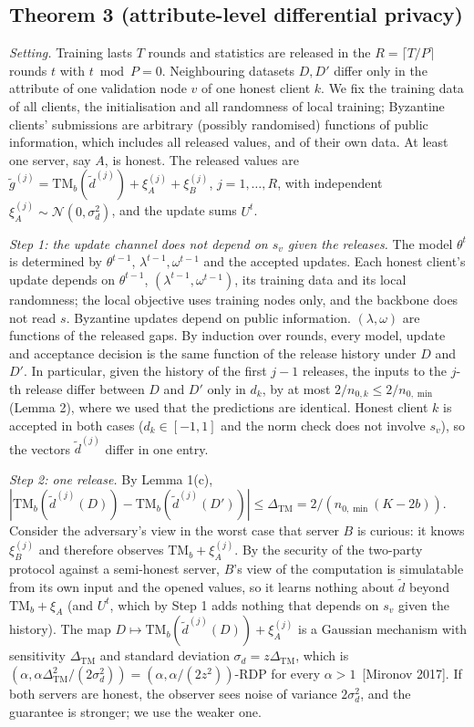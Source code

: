 \documentclass[11pt]{article}
\theoremstyle{plain}
\theoremstyle{definition}
\newcommand{\TM}{\mathrm{TM}_b}
\newcommand{\DTM}{\Delta_{\mathrm{TM}}}
\newcommand{\gt}{\tilde g}
\begin{document}
\subsection*{Theorem 3 (attribute-level differential privacy)}
\emph{Setting.} Training lasts $T$ rounds and statistics are released in the $R=\lceil T/P\rceil$ rounds $t$ with $t\bmod P=0$. Neighbouring datasets $D,D'$ differ only in the attribute of one validation node $v$ of one honest client $k$. We fix the training data of all clients, the initialisation and all randomness of local training; Byzantine clients' submissions are arbitrary (possibly randomised) functions of public information, which includes all released values, and of their own data. At least one server, say $A$, is honest. The released values are $\gt^{(j)}=\TM(\tilde d^{(j)})+\xi_A^{(j)}+\xi_B^{(j)}$, $j=1,\dots,R$, with independent $\xi_A^{(j)}\sim\mathcal{N}(0,\sigma_d^2)$, and the update sums $U^t$.

\emph{Step 1: the update channel does not depend on $s_v$ given the releases.} The model $\theta^{t}$ is determined by $\theta^{t-1}$, $\lambda^{t-1},\omega^{t-1}$ and the accepted updates. Each honest client's update depends on $\theta^{t-1}$, $(\lambda^{t-1},\omega^{t-1})$, its training data and its local randomness; the local objective uses training nodes only, and the backbone does not read $s$. Byzantine updates depend on public information. $(\lambda,\omega)$ are functions of the released gaps. By induction over rounds, every model, update and acceptance decision is the same function of the release history under $D$ and $D'$. In particular, given the history of the first $j-1$ releases, the inputs to the $j$-th release differ between $D$ and $D'$ only in $d_k$, by at most $2/n_{0,k}\le2/n_{0,\min}$ (Lemma 2), where we used that the predictions are identical. Honest client $k$ is accepted in both cases ($d_k\in[-1,1]$ and the norm check does not involve $s_v$), so the vectors $\tilde d^{(j)}$ differ in one entry.

\emph{Step 2: one release.} By Lemma 1(c), $|\TM(\tilde d^{(j)}(D))-\TM(\tilde d^{(j)}(D'))|\le\DTM=2/(n_{0,\min}(K-2b))$. Consider the adversary's view in the worst case that server $B$ is curious: it knows $\xi_B^{(j)}$ and therefore observes $\TM+\xi_A^{(j)}$. By the security of the two-party protocol against a semi-honest server, $B$'s view of the computation is simulatable from its own input and the opened values, so it learns nothing about $\tilde d$ beyond $\TM+\xi_A$ (and $U^t$, which by Step 1 adds nothing that depends on $s_v$ given the history). The map $D\mapsto\TM(\tilde d^{(j)}(D))+\xi_A^{(j)}$ is a Gaussian mechanism with sensitivity $\DTM$ and standard deviation $\sigma_d=z\DTM$, which is $(\alpha,\alpha\DTM^2/(2\sigma_d^2))=(\alpha,\alpha/(2z^2))$-RDP for every $\alpha>1$~[Mironov 2017]. If both servers are honest, the observer sees noise of variance $2\sigma_d^2$, and the guarantee is stronger; we use the weaker one.
\end{document}
